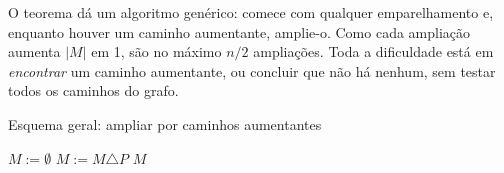 O teorema dá um algoritmo genérico: comece com qualquer emparelhamento e, enquanto houver um caminho aumentante, amplie-o. Como cada ampliação aumenta $|M|$ em 1, são no máximo $n/2$ ampliações. Toda a dificuldade está em \emph{encontrar} um caminho aumentante, ou concluir que não há nenhum, sem testar todos os caminhos do grafo.
\begin{pseudo}{Esquema geral: ampliar por caminhos aumentantes}
\begin{algorithmic}
  \State $M:=\emptyset$ 
    \State $M:=M\triangle P$ 
  \EndWhile
  \State \Return $M$ 
\EndFunction
\end{algorithmic}
\end{pseudo}

